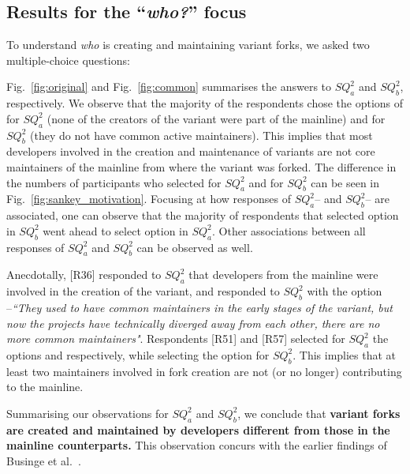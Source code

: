\subsection{Results for the ``\emph{who?}'' focus}
To understand \emph{who} is creating and maintaining variant forks, we asked two multiple-choice questions:

 \noindent \rqTwoOne

\noindent \rqTwoTwo

Fig.~\ref{fig:original} and Fig.~\ref{fig:common} summarises the answers to $SQ^2_{a}$ and $SQ^2_{b}$, respectively. 
We observe that the majority of the respondents chose the options of  for $SQ^2_{a}$ (none of the creators of the variant were part of the mainline) and  for  $SQ^2_{b}$ (they do not have common active maintainers).
This implies that most developers involved in the creation and maintenance of variants are not core maintainers of the mainline from where the variant was forked.
The difference in the numbers of participants who selected   for $SQ^2_{a}$ and  for $SQ^2_{b}$ can be seen in Fig.~\ref{fig:sankey_motivation}.
Focusing at how responses of $SQ^2_{a}$-- and $SQ^2_{b}$-- are associated, one can observe that the majority of respondents that selected option  in $SQ^2_{b}$ went ahead to select option  in $SQ^2_{a}$. Other associations between all responses of $SQ^2_{a}$ and $SQ^2_{b}$ can be observed as well.

Anecdotally, [R36] responded to  $SQ^2_{a}$ that  developers from the mainline were involved in the creation of the variant, and responded to $SQ^2_{b}$ with the option  --\emph{``They used to have common maintainers in the early stages of the variant, but now the projects have technically diverged away from each other, there are no more common maintainers"}.
Respondents [R51] and [R57] selected for $SQ^2_{a}$ the options  and  respectively, while selecting the option  for $SQ^2_{b}$. This implies that at least two maintainers involved in fork creation are not (or no longer) contributing to the mainline.


Summarising our observations for $SQ^2_{a}$ and $SQ^2_{b}$, we conclude that \textbf{variant forks are created and maintained by developers different from those in the mainline counterparts.} This observation concurs with the earlier findings of  Businge et al.~\cite{businge:emse:2021}.

